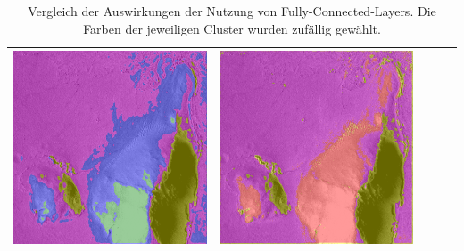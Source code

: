 \begin{table}[h!]
\begin{tabularx}{\textwidth}{>{\centering}m{}
			>{\centering}m{}
			>{\centering}m{}
			>{\centering}m{}
			>{\centering\arraybackslash}m{}}
		\includegraphics[width=0.9\linewidth]{images/gen/fully_connected/p03_04.png_1.png} &
		\includegraphics[width=0.9\linewidth]{images/gen/fully_connected/p03_04.png_2.png} \\
		\bottomrule
	\end{tabularx}
	\caption{Vergleich der Auswirkungen der Nutzung von Fully-Connected-Layers. Die Farben der jeweiligen Cluster wurden zufällig gewählt.}
	\label{tab:fc_comparision}
\end{table}

